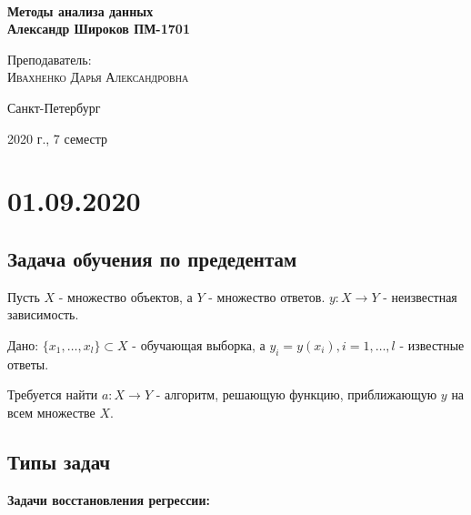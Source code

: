 \documentclass[aps,%
12pt,%
final,%
oneside,
onecolumn,%
musixtex, %
superscriptaddress,%
centertags]{article} %
\theoremstyle{plain}
\theoremstyle{definition}
\theoremstyle{remark}
\begin{document}
\begin{titlepage} 
\begin{center}
\textbf{}\\[10.0cm]
\textbf{\LARGE Методы анализа данных}\\[0.5cm]
\textbf{\Large Александр Широков ПМ-1701} \\[0.2cm]


\begin{center} \large
{Преподаватель:} \\[0.5cm]
\textsc {Ивахненко Дарья Александровна}\\
\end{center}

\vfill 



{\large {Санкт-Петербург}} \par
{\large {2020 г., 7 семестр}}
\end{center} 
\end{titlepage}

\begin{thebibliography}{3}
\end{thebibliography}
\tableofcontents
\newpage

\section{01.09.2020}

\subsection{Задача обучения по предедентам}

Пусть $X$ - множество объектов, а $Y$ - множество ответов. $y: X \to Y$ - неизвестная зависимость.

Дано: $\{x_1,\ldots,x_l\} \subset X$ - обучающая выборка, а $y_i = y(x_i), i = 1, \ldots,l$ - известные ответы.

Требуется найти $a: X \to Y$ - алгоритм, решающую функцию, приближающую $y$ на всем множестве $X$.

\subsection{Типы задач}

\textbf{Задачи восстановления регрессии:}
\end{document}
